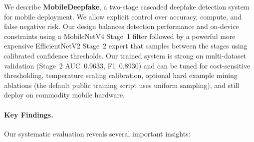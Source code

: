 We describe \textbf{MobileDeepfake}, a two\hyp stage cascaded deepfake detection system for mobile deployment. We allow explicit control over accuracy, compute, and false negative risk. Our design balances detection performance and on\hyp device constraints using a MobileNetV4 Stage~1 filter followed by a powerful more expensive EfficientNetV2 Stage~2 expert that samples between the stages using calibrated confidence thresholds. Our trained system is strong on multi\hyp dataset validation (Stage~2 AUC~\num{0.9633}, F1~\num{0.8930}) and can be tuned for cost\hyp sensitive thresholding, temperature scaling calibration, optional hard example mining ablations (the default public training script uses uniform sampling), and still deploy on commodity mobile hardware.

\paragraph{Key Findings.}
Our systematic evaluation reveals several important insights:

